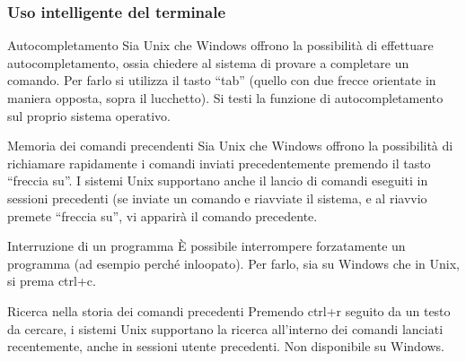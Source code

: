 \documentclass{beamer}
\begin{document}
\begin{frame}[fragile]
\frametitle{Uso intelligente del terminale}
\begin{block}{Autocompletamento}
\scriptsize{}
Sia Unix che Windows offrono la possibilità di effettuare autocompletamento, ossia chiedere al sistema di provare a completare un comando. Per farlo si utilizza il tasto ``tab'' (quello con due frecce orientate in maniera opposta, sopra il lucchetto). Si testi la funzione di autocompletamento sul proprio sistema operativo.
\end{block}
\begin{block}{Memoria dei comandi precendenti}
\scriptsize{}
Sia Unix che Windows offrono la possibilità di richiamare rapidamente i comandi inviati precedentemente premendo il tasto ``freccia su''. I sistemi Unix supportano anche il lancio di comandi eseguiti in sessioni precedenti (se inviate un comando e riavviate il sistema, e al riavvio premete ``freccia su'', vi apparirà il comando precedente. 
\end{block}
\begin{block}{Interruzione di un programma}
\scriptsize{}
È possibile interrompere forzatamente un programma (ad esempio perché inloopato). Per farlo, sia su Windows che in Unix, si prema ctrl+c.
\end{block}
\begin{block}{Ricerca nella storia dei comandi precedenti}
\scriptsize{}
Premendo ctrl+r seguito da un testo da cercare, i sistemi Unix supportano la ricerca all'interno dei comandi lanciati recentemente, anche in sessioni utente precedenti. Non disponibile su Windows.
\end{block}
\end{frame}
\end{document}
